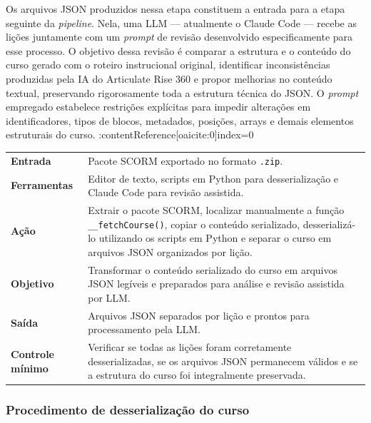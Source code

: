 \documentclass[12pt,a4paper]{article}
\newcommand{\campo}[1]{\textcolor{azulinst}{\textbf{#1}}}
\begin{document}
Os arquivos JSON produzidos nessa etapa constituem a entrada para a etapa seguinte da \textit{pipeline}. Nela, uma LLM — atualmente o Claude Code — recebe as lições juntamente com um \textit{prompt} de revisão desenvolvido especificamente para esse processo. O objetivo dessa revisão é comparar a estrutura e o conteúdo do curso gerado com o roteiro instrucional original, identificar inconsistências produzidas pela IA do Articulate Rise 360 e propor melhorias no conteúdo textual, preservando rigorosamente toda a estrutura técnica do JSON. O \textit{prompt} empregado estabelece restrições explícitas para impedir alterações em identificadores, tipos de blocos, metadados, posições, arrays e demais elementos estruturais do curso. :contentReference[oaicite:0]{index=0}

\begin{longtable}{p{}p{}}
\toprule

\campo{Entrada} &
Pacote SCORM exportado no formato \texttt{.zip}. \\[0.7cm]

\campo{Ferramentas} &
Editor de texto, scripts em Python para desserialização e Claude Code para revisão assistida. \\[1.4cm]

\campo{Ação} &
Extrair o pacote SCORM, localizar manualmente a função \texttt{\_\_fetchCourse()}, copiar o conteúdo serializado, desserializá-lo utilizando os scripts em Python e separar o curso em arquivos JSON organizados por lição. \\[2.5cm]

\campo{Objetivo} &
Transformar o conteúdo serializado do curso em arquivos JSON legíveis e preparados para análise e revisão assistida por LLM. \\[2cm]

\campo{Saída} &
Arquivos JSON separados por lição e prontos para processamento pela LLM. \\[1.4cm]

\campo{Controle mínimo} &
Verificar se todas as lições foram corretamente desserializadas, se os arquivos JSON permanecem válidos e se a estrutura do curso foi integralmente preservada. \\[0.7cm]

\bottomrule
\end{longtable}

\subsubsection*{Procedimento de desserialização do curso}
\end{document}
